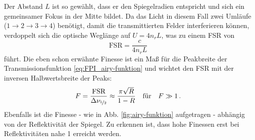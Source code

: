 Der Abstand $L$ ist so gewählt, dass er den Spiegelradien entspricht und sich
ein gemeinsamer Fokus in der Mitte bildet. Da das Licht
in diesem Fall zwei Umläufe ($1\rightarrow2\rightarrow3\rightarrow4$)
benötigt, damit die transmittierten Felder interferieren können,
verdoppelt sich die optische Weglänge auf $U=4n_rL$, was zu einem FSR von
\begin{equation}\label{eq:FPI_FSR_02}
	\text{FSR}=\frac{c}{4n_rL}
\end{equation}
führt. Die eben schon erwähnte Finesse ist ein Maß für die Peakbreite der
Transmissionsfunktion \eqref{eq:FPI_airy-funktion} und wichtet den FSR mit der
inversen Halbwertsbreite der Peaks:
\begin{equation}\label{eq:FPI_finesse}
	F=\frac{\text{FSR}}{\Delta\nu_{\nicefrac{1}{2}}}\approx\frac{\pi\sqrt{R}}{1-R}
	\quad\text{für}\quad F\gg1\,.
\end{equation}
Ebenfalls ist die Finesse - wie in Abb. \ref{fig:airy-funktion} aufgetragen
- abhängig von der Reflektivität der Spiegel. Zu erkennen ist, dass hohe
Finessen erst bei Reflektivitäten nahe 1 erreicht werden.

